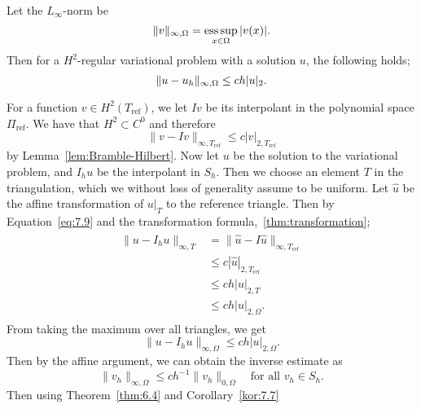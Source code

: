 \begin{thmx}{\quad\label{thm:max_error}}
    Let the $L_\infty$-norm be 
    \begin{equation*}
        \|v\|_{\infty, \Omega} = \operatorname*{ess\,sup}_{x\in\Omega} |v(x)|.
    \end{equation*}
    Then 
    for a $H^2$-regular variational problem with a solution $u$, the following holds;
    \begin{equation}
        \|u-u_h\|_{\infty, \Omega}\leq ch|u|_2.
    \end{equation}
\end{thmx}
\begin{bev}
    For a function $v\in H^2(T_{\text{ref}})$, we let $Iv$ be its interpolant in the polynomial space $\Pi_{\text{ref}}$.
    We have that $H^2\subset C^0$ and therefore 
    \begin{equation}
        \|v-Iv\|_{\infty,T_\text{ref}} \leq c|v|_{2,T_\text{ref}}
        \label{eq:7.9}
    \end{equation}
    by Lemma~\ref{lem:Bramble-Hilbert}.
    Now let $u$ be the solution to the variational problem, and $I_h u$ be the interpolant in $S_h$.
    Then we choose an element $T$ in the triangulation, which we without loss of generality assume to be uniform. 
    Let $\hat{u}$ be the affine transformation of $u|_T$ to the reference triangle.
    Then by Equation~\ref{eq:7.9} and the transformation formula,~\ref{thm:transformation};
    \begin{align}
        \begin{split}
            \|u-I_h u\|_{\infty,T} &= \|\hat{u} - I\hat{u}\|_{\infty,T_{\text{ref}}} \\
            &\leq c|\hat{u}|_{2,T_{\text{ref}}} \\
            &\leq ch|u|_{2,T} \\
            &\leq ch|u|_{2,\Omega}.
        \end{split}
    \end{align}
    From taking the maximum over all triangles, we get
    \begin{equation}
        \|u - I_h u \|_{\infty,\Omega} \leq ch|u|_{2,\Omega}.
        \label{eq:7.10}
    \end{equation}
    Then by the affine argument, we can obtain the inverse estimate as
    \begin{equation}
        \|v_h\|_{\infty,\Omega} \leq ch^{-1} \|v_h\|_{0,\Omega} \quad \text{for all } v_h\in S_h.
    \end{equation}
    Then using Theorem~\ref{thm:6.4} and Corollary~\ref{kor:7.7}

\end{bev}
